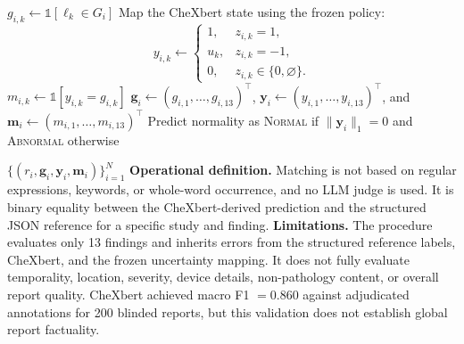 \documentclass[11pt]{article}
\begin{document}
\begin{algorithm}[H]
\begin{algorithmic}[1]
        \State $g_{i,k}\gets\mathbb{1}[\ell_k\in G_i]$ 
        \State Map the CheXbert state using the frozen policy:
        \[
        y_{i,k}\gets
        \begin{cases}
            1, & z_{i,k}=1,\\
            u_k, & z_{i,k}=-1,\\
            0, & z_{i,k}\in\{0,\varnothing\}.
        \end{cases}
        \]
        \State $m_{i,k}\gets\mathbb{1}[y_{i,k}=g_{i,k}]$
    \EndFor
    \State $\mathbf{g}_i\gets(g_{i,1},\ldots,g_{i,13})^{\top}$, $\mathbf{y}_i\gets(y_{i,1},\ldots,y_{i,13})^{\top}$, and $\mathbf{m}_i\gets(m_{i,1},\ldots,m_{i,13})^{\top}$
    \State Predict normality as \textsc{Normal} if $\|\mathbf{y}_i\|_1=0$ and \textsc{Abnormal} otherwise
\EndFor

\State \Return $\{(r_i,\mathbf{g}_i,\mathbf{y}_i,\mathbf{m}_i)\}_{i=1}^{N}$
\Statex
\Statex \textbf{Operational definition.} Matching is not based on regular expressions, keywords, or whole-word occurrence, and no LLM judge is used. It is binary equality between the CheXbert-derived prediction and the structured JSON reference for a specific study and finding.
\Statex
\Statex \textbf{Limitations.} The procedure evaluates only 13 findings and inherits errors from the structured reference labels, CheXbert, and the frozen uncertainty mapping. It does not fully evaluate temporality, location, severity, device details, non-pathology content, or overall report quality. CheXbert achieved macro F1 $=0.860$ against adjudicated annotations for 200 blinded reports, but this validation does not establish global report factuality.

\end{algorithmic}
\end{algorithm}
\end{document}
